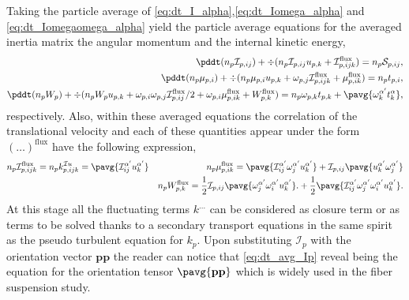 Taking the particle average of \ref{eq:dt_I_alpha},\ref{eq:dt_Iomega_alpha} and \ref{eq:dt_Iomegaomega_alpha} yield the particle average equations for the averaged inertia matrix the angular momentum and the internal kinetic energy, 
\begin{align}
    \label{eq:dt_avg_Ip}
    \pddt (n_p\mathcal{I}_{p,ij})
    + \div (n_p\mathcal{I}_{p,ij} u_{p,k}
    + \mathcal{I}^\text{flux}_{p,ijk})
    = n_p \mathcal{S}_{p,ij},\\ 
    \label{eq:dt_avg_mup}
    \pddt (
    n_p \mu_{p,i}
    )
    + \div (
        n_p \mu_{p,i}u_{p,k}
    +  \omega_{p,j} \mathcal{I}^\text{flux}_{p,ijk}
    + \mu_{p,ik}^\text{flux}
    )
    = n_p t_{p,i},\\
    \pddt (n_p W_p)
    + \div  (
        n_p W_p u_{p,k}
        + \omega_{p,i} \omega_{p,j}
        \mathcal{I}_{p,ij}^\text{flux}/2
        + \omega_{p,i}\mu_{p,ik}^\text{flux}
    + W_{p,k}^\text{flux}
    )
    = 
    n_p \omega_{p,k} t_{p,k}
    +  \pavg{\omega_k^{\alpha'} t^\alpha_k},
\end{align}
respectively. 
Also, within these averaged equations the correlation of the translational velocity and each of these quantities  appear under the form $(\ldots)^\text{flux}$ have the following expression, 
\begin{align*}
    n_p \mathcal{I}_{p,ijk}^\text{flux}
    = n_p k_{p,ijk}^{\mathcal{I}u}
    = 
    \pavg{\mathcal{I}^{\alpha'}_{ij} u_{k}^{\alpha'}}
    &&
    n_p \mu_{p,ik}^\text{flux}
    = 
    \pavg{\mathcal{I}^{\alpha'}_{ij} \omega^{\alpha'}_j u_{k}^{\alpha'}} 
    + \mathcal{I}_{p,ij} \pavg{u_k^{\alpha'}\omega_j^{\alpha'}}\\
    && n_p W_{p,k}^\text{flux}
    = \frac{1}{2}\mathcal{I}_{p,ij}
    \pavg{
        \omega_j^{\alpha'}
        \omega_i^{\alpha'}
        u_k^{\alpha'}
    }.
    + \frac{1}{2}\pavg{
        \mathcal{I}_{ij}^{\alpha'}
        \omega_j^{\alpha'}
        \omega_i^{\alpha'}
        u_k^{\alpha'}
    }.
\end{align*}
At this stage all the fluctuating terms $k^{\ldots}$ can be considered as closure term or as terms to be solved thanks to a secondary transport equations in the same spirit as the pseudo turbulent equation for $k_p$.
Upon substituting $\mathcal{I}_p$ with the orientation vector $\textbf{pp}$ the reader can notice that \ref{eq:dt_avg_Ip} reveal being the equation for the orientation tensor $\pavg{\textbf{pp}}$ \citep{wang2008objective} which is widely used in the fiber suspension study. 
